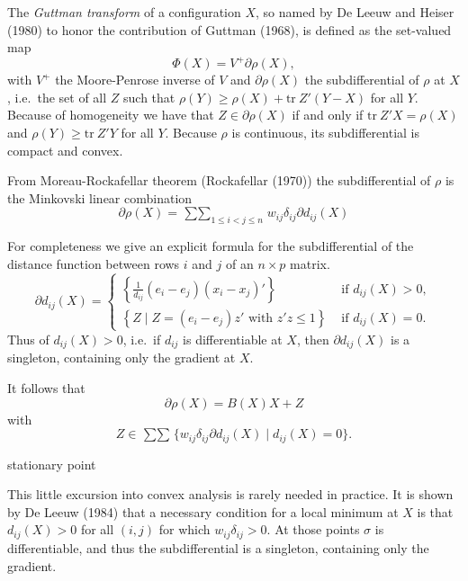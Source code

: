 \documentclass[
  12pt,
]{article}
\begin{document}
The \emph{Guttman transform} of a configuration \(X\), so named by De Leeuw and Heiser (1980) to honor the contribution of Guttman (1968), is defined as the set-valued map
\begin{equation}
\Phi(X)=V^+\partial\rho(X),
\label{eq:phidef}
\end{equation}
with \(V^+\) the Moore-Penrose inverse of \(V\) and \(\partial\rho(X)\) the
subdifferential of \(\rho\) at \(X\), i.e.~the set of all \(Z\) such that
\(\rho(Y)\geq\rho(X)+\text{tr}\ Z'(Y-X)\)
for all \(Y\). Because of homogeneity we have that \(Z\in\partial\rho(X)\)
if and only if \(\text{tr}\ Z'X=\rho(X)\) and
\(\rho(Y)\geq\text{tr}\ Z'Y\) for all \(Y\). Because \(\rho\) is continuous,
its subdifferential is compact and convex.

From Moreau-Rockafellar theorem (Rockafellar (1970)) the subdifferential of
\(\rho\) is the Minkovski linear combination
\begin{equation}
\partial\rho(X)=\mathop{\sum\sum}_{1\leq i<j\leq n}w_{ij}\delta_{ij}\partial d_{ij}(X)
\label{eq:subdif}
\end{equation}

For completeness we give an explicit formula for the subdifferential of the distance function between rows \(i\) and \(j\) of an \(n\times p\) matrix.
\begin{equation}
\partial d_{ij}(X)=\begin{cases}
\left\{\frac{1}{d_{ij}}(e_i-e_j)(x_i-x_j)'\right\}&\text{ if }d_{ij}(X)>0,\\
\left\{Z\mid Z=(e_i-e_j)z'\text{ with }z'z\leq1\right\}&\text{ if }d_{ij}(X)=0.
\end{cases}
\label{eq:dsubsef}
\end{equation}
Thus of \(d_{ij}(X)>0\), i.e.~if \(d_{ij}\) is differentiable at \(X\),
then \(\partial d_{ij}(X)\) is a singleton, containing only the gradient
at \(X\).

It follows that
\begin{equation}
\partial\rho(X)=B(X)X+Z
\label{eq:rhosubdef}
\end{equation}
with
\begin{equation}
Z\in\mathop{\sum\sum}\{w_{ij}\delta_{ij}\partial d_{ij}(X)\mid d_{ij}(X)=0\}.
\label{eq:zsubdef}
\end{equation}

stationary point

This little excursion into convex analysis is rarely needed in practice. It is
shown by De Leeuw (1984) that a necessary condition for a local minimum at \(X\)
is that \(d_{ij}(X)>0\) for all \((i,j)\) for which \(w_{ij}\delta_{ij}>0\). At those
points \(\sigma\) is differentiable, and thus the subdifferential is a singleton,
containing only the gradient.
\end{document}

